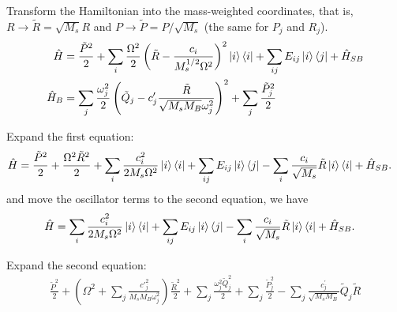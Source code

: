 \documentclass{article}
\begin{document}
Transform the Hamiltonian into the mass-weighted coordinates, that is, $R\to \tilde{R}=\sqrt{M_s}R$ and $P\to \tilde{P}=P/\sqrt{M_s}$ (the same for $P_j$ and $R_j$).
\begin{align*}
	\hat{H} &= \frac{\tilde{P}^{2}}{2}
	+\sum_{i} \frac{\Omega^{2}}{2} \left(\tilde{R}-\frac{c_{i}}{M_{s}^{1/2} \Omega^{2}}\right)^{2}\ket{i}\bra{i}
	+\sum_{ij}E_{ij}\ket{i}\bra{j}+\hat{H}_{S B}\\
	\hat{H}_{B} &= \sum_j \frac{\omega_{j}^{2}}{2} \left(\tilde{Q}_{j}-c^{\prime}_{j} \frac{\tilde{R}}{\sqrt{M_sM_{B}} \omega_{j}^{2}}\right)^{2} + \sum_j\frac{\tilde{P}_j^2}{2}
\end{align*}

Expand the first equation:
\begin{align*}
	\hat{H} &= 
	\frac{\tilde{P}^{2}}{2}
	+ \frac{\Omega^{2}\tilde{R}^2}{2}
	+ \sum_i \frac{c_{i}^2}{2M_{s} \Omega^{2}} \ket{i}\bra{i}
	+ \sum_{ij}E_{ij}\ket{i}\bra{j}
	- \sum_{i}\frac{c_{i}}{\sqrt{M_s}} \tilde{R}\ket{i}\bra{i}
	+\hat{H}_{S B}.
\end{align*}
and move the oscillator terms to the second equation, we have
\begin{align}
	\hat{H} &= 
	\sum_i \frac{c_{i}^2}{2M_{s} \Omega^{2}} \ket{i}\bra{i}
	+ \sum_{ij}E_{ij}\ket{i}\bra{j}
	- \sum_{i}\frac{c_{i}}{\sqrt{M_s}} \tilde{R}\ket{i}\bra{i}
	+\hat{H}_{S B}.
	\label{eq:sys+coupling}
\end{align}

Expand the second equation:
\begin{align*}
	\frac{\tilde{P}^{2}}{2}
	+ \left( \Omega^{2}+\sum_j \frac{ c'^ 2_{j}}{M_sM_B \omega_{j}^{2}}\right)\frac{\tilde{R}^2}{2}
	+ \sum_j \frac{\omega_{j}^{2}\tilde{Q}_j^2}{2}
	+ \sum_j\frac{\tilde{P}_j^2}{2}
	- \sum_j  \frac{c^{\prime}_{j}}{\sqrt{M_sM_B}} \tilde{Q}_{j}\tilde{R}
\end{align*}
\end{document}
